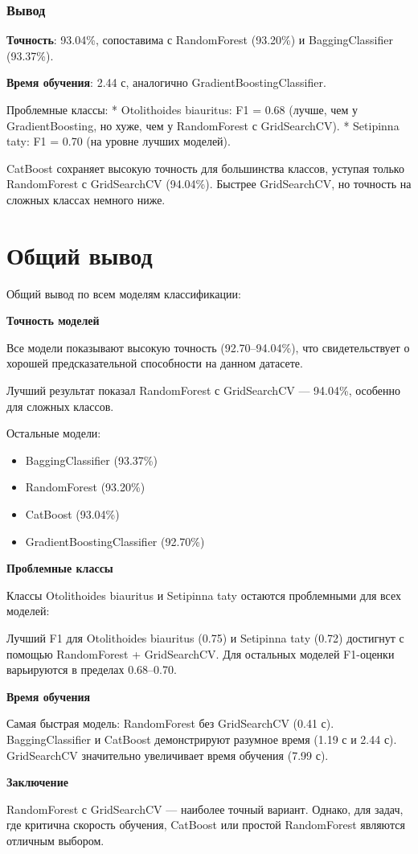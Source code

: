 \documentclass[14pt,a4paper,oneside]{extarticle}
\begin{document}
    \hypertarget{ux432ux44bux432ux43eux434}{%
\subsubsection*{\large Вывод}\label{ux432ux44bux432ux43eux434}}

\textbf{Точность}: 93.04\%, сопоставима с RandomForest (93.20\%) и
BaggingClassifier (93.37\%).

\textbf{Время обучения}: 2.44 с, аналогично GradientBoostingClassifier.

Проблемные классы: * Otolithoides biauritus: F1 = 0.68 (лучше, чем у
GradientBoosting, но хуже, чем у RandomForest с GridSearchCV). *
Setipinna taty: F1 = 0.70 (на уровне лучших моделей).

CatBoost сохраняет высокую точность для большинства классов, уступая
только RandomForest с GridSearchCV (94.04\%). Быстрее GridSearchCV, но
точность на сложных классах немного ниже.


\clearpage

    \hypertarget{ux432ux44bux99999}{%
\section*{\Large Общий вывод}\label{ux432ux44bux99999}}

Общий вывод по всем моделям классификации:

\textbf{\large Точность моделей}

Все модели показывают высокую точность (92.70–94.04\%),
что свидетельствует о хорошей предсказательной способности на данном датасете.

Лучший результат показал RandomForest с GridSearchCV --- 94.04\%,
особенно для сложных классов.

Остальные модели:

\begin{itemize}
	\item BaggingClassifier (93.37\%)
	\item RandomForest (93.20\%)
	\item CatBoost (93.04\%)
	\item GradientBoostingClassifier (92.70\%)
\end{itemize}

\textbf{\large Проблемные классы}

Классы Otolithoides biauritus и Setipinna taty
остаются проблемными для всех моделей:

Лучший F1 для Otolithoides biauritus (0.75) и Setipinna taty (0.72)
достигнут с помощью RandomForest + GridSearchCV.
Для остальных моделей F1-оценки варьируются в пределах 0.68–0.70.

\textbf{\large Время обучения}

Самая быстрая модель: RandomForest без GridSearchCV (0.41 с).
BaggingClassifier и CatBoost демонстрируют разумное время (1.19 с и 2.44 с).
GridSearchCV значительно увеличивает время обучения (7.99 с).

\textbf{\large Заключение}

RandomForest с GridSearchCV --- наиболее точный вариант.
Однако, для задач, где критична скорость обучения,
CatBoost или простой RandomForest являются отличным выбором.
    
\end{document}
